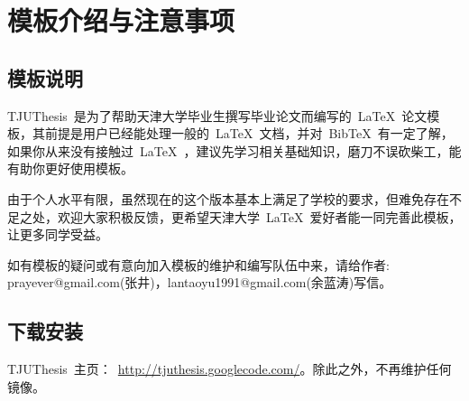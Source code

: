 
\chapter{模板介绍与注意事项}

\section{模板说明}

TJUThesis~是为了帮助天津大学毕业生撰写毕业论文而编写的~\LaTeX~论文模板，其前提是用户已经能处理一般的~\LaTeX~文档，并对~BibTeX~有一定了解，如果你从来没有接触过~\LaTeX~，建议先学习相关基础知识，磨刀不误砍柴工，能有助你更好使用模板。

由于个人水平有限，虽然现在的这个版本基本上满足了学校的要求，但难免存在不足之处，欢迎大家积极反馈，更希望天津大学~\LaTeX~爱好者能一同完善此模板，让更多同学受益。

如有模板的疑问或有意向加入模板的维护和编写队伍中来，请给作者: prayever@gmail.com(张井)，lantaoyu1991@gmail.com(余蓝涛)写信。

\section{下载安装}
TJUThesis~主页：~\url{http://tjuthesis.googlecode.com/}。除此之外，不再维护任何镜像。

